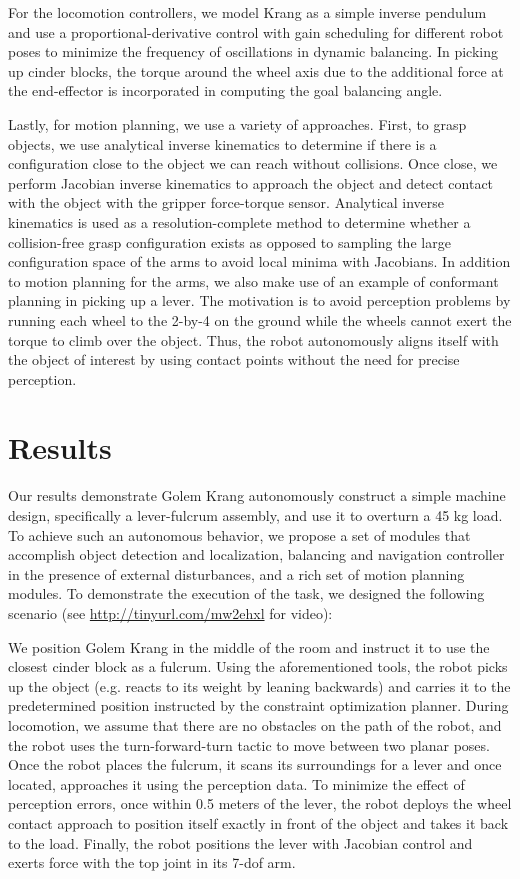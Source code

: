 \documentclass[runningheads,a4paper]{llncs}
\begin{document}
For the locomotion controllers, we model Krang as a simple inverse pendulum and use a
proportional-derivative control with gain scheduling for different robot poses to minimize the
frequency of oscillations in dynamic balancing. In picking up cinder blocks, the torque around the
wheel axis due to the additional force at the end-effector is incorporated in computing the goal
balancing angle.

Lastly, for motion planning, we use a variety of approaches. First, to grasp objects, we use
analytical inverse kinematics to determine if there is a configuration close to the object we can
reach without collisions. Once close, we perform Jacobian inverse kinematics to approach the object
and detect contact with the object with the gripper force-torque sensor. Analytical inverse
kinematics is used as a resolution-complete method to determine whether a collision-free grasp
configuration exists as opposed to sampling the large configuration space of the arms to avoid local
minima with Jacobians. In addition to motion planning for the arms, we also make use of an example
of conformant planning in picking up a lever. The motivation is to avoid perception problems by
running each wheel to the 2-by-4 on the ground while the wheels cannot exert the torque to climb
over the object. Thus, the robot autonomously aligns itself with the object of interest by using
contact points without the need for precise perception.

\section{Results}

Our results demonstrate Golem Krang autonomously construct a simple machine design, specifically a
lever-fulcrum assembly, and use it to overturn a 45 kg load. To achieve such an autonomous behavior,
we propose a set of modules that accomplish object detection and localization, balancing and
navigation controller in the presence of external disturbances, and a rich set of motion planning
modules. To demonstrate the execution of the task, we designed the following scenario (see
\url{http://tinyurl.com/mw2ehxl} for video):

We position Golem Krang in the middle of the room and instruct it to use the closest cinder block as
a fulcrum. Using the aforementioned tools, the robot picks up the object (e.g. reacts to its weight
by leaning backwards) and carries it to the predetermined position instructed by the constraint
optimization planner. During locomotion, we assume that there are no obstacles on the path of the
robot, and the robot uses the turn-forward-turn tactic to move between two planar poses. Once the
robot places the fulcrum, it scans its surroundings for a lever and once located, approaches it
using the perception data. To minimize the effect of perception errors, once within 0.5 meters of
the lever, the robot deploys the wheel contact approach to position itself exactly in front of the
object and takes it back to the load. Finally, the robot positions the lever with Jacobian control
and exerts force with the top joint in its 7-dof arm.
\end{document}
